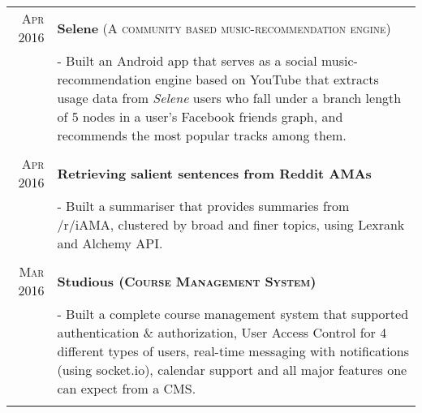 \documentclass[a4paper,10pt]{extarticle} %
\begin{document}
\begin{tabular}{r|p{17.5cm}}
\textsc{Apr 2016} & \textbf{Selene} \textsc{(A community based music-recommendation engine)} \\
& \footnotesize{- Built an Android app that serves as a social music-recommendation engine based on YouTube that extracts usage data from {\itshape{Selene}} users who fall under a branch length of 5 nodes in a user's Facebook friends graph, and recommends the most popular tracks among them.}\\
\multicolumn{2}{c}{} \\

\textsc{Apr 2016} & \textbf{Retrieving salient sentences from Reddit AMAs} \\
& \footnotesize{- Built a summariser that provides summaries from /r/iAMA, clustered by broad and finer topics, using Lexrank and Alchemy API.}\\
\multicolumn{2}{c}{} \\

\textsc{Mar 2016} & \textbf{Studious \textsc{(Course Management System)}}\\
& \footnotesize{- Built a complete course management system that supported authentication \& authorization, User Access Control for 4 different types of users, real-time messaging with notifications (using socket.io), calendar support and all major features one can expect from a CMS.}\\
\multicolumn{2}{c}{} \\


\end{tabular}
\end{document}
